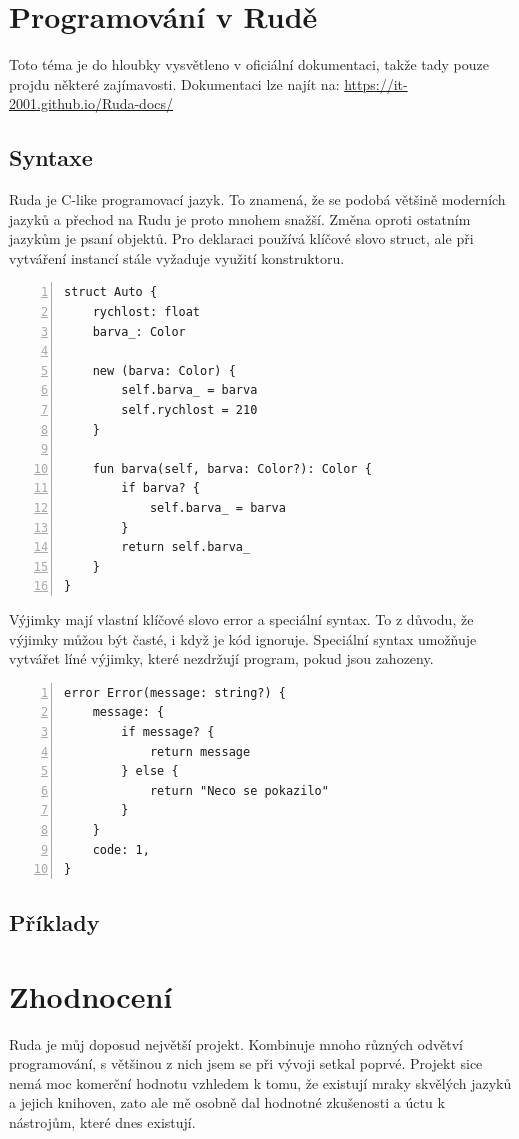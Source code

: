 \documentclass[12pt, a4paper,
twoside,        %
openright
]{report}
\let\oldchapter\chapter
\renewcommand{\chapter}{
	\clearpage
	\pagestyle{fancy}
	\oldchapter
}
\begin{document}
\chapter{Programování v Rudě}

Toto téma je do hloubky vysvětleno v oficiální dokumentaci, takže tady pouze projdu některé zajímavosti. Dokumentaci lze najít na: \url{https://it-2001.github.io/Ruda-docs/}

\section{Syntaxe}

Ruda je C-like programovací jazyk. To znamená, že se podobá většině moderních jazyků a přechod na Rudu je proto mnohem snažší. Změna oproti ostatním jazykům je psaní objektů. Pro deklaraci používá klíčové slovo struct, ale při vytváření instancí stále vyžaduje využití konstruktoru.

\begin{lstlisting}[numbers=left, caption={Struktura}]
struct Auto {
	rychlost: float
	barva_: Color
	
	new (barva: Color) {
		self.barva_ = barva
		self.rychlost = 210
	}
	
	fun barva(self, barva: Color?): Color {
		if barva? {
			self.barva_ = barva
		}
		return self.barva_
	}
}
\end{lstlisting}

\clearpage

Výjimky mají vlastní klíčové slovo error a speciální syntax. To z důvodu, že výjimky můžou být časté, i když je kód ignoruje. Speciální syntax umožňuje vytvářet líné výjimky, které nezdržují program, pokud jsou zahozeny.

\begin{lstlisting}[numbers=left, caption={Výjimky}]
error Error(message: string?) {
	message: {
		if message? {
			return message
		} else {
			return "Neco se pokazilo"
		}
	}
	code: 1,
}
\end{lstlisting}

\section{Příklady}

\chapter{Zhodnocení}

Ruda je můj doposud největší projekt. Kombinuje mnoho různých odvětví programování, s většinou z nich jsem se při vývoji setkal poprvé. Projekt sice nemá moc komerční hodnotu vzhledem k tomu, že existují mraky skvělých jazyků a jejich knihoven, zato ale mě osobně dal hodnotné zkušenosti a úctu k nástrojům, které dnes existují.
\end{document}
